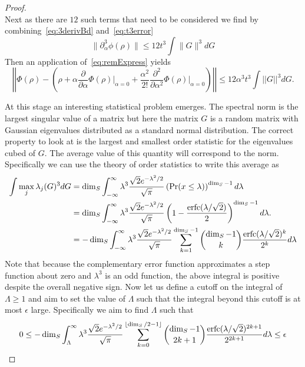\documentclass{article}
\newcommand{\norm}[1]{\left| \left| #1 \right| \right|}
\begin{document}
\begin{proof}
\begin{equation}
\end{equation}
Next as there are $12$ such terms that need to be considered we find by combining~\eqref{eq:3derivBd} and~\eqref{eq:t3error}
\begin{equation}
    \|\partial_\alpha^3 \phi(\rho) \| \le 12t^3\int \|G\|^3 dG
\end{equation}
Then an application of~\eqref{eq:remExpress} yields
\begin{equation}
    \norm{\Phi(\rho) - \left(\rho + {\alpha} \frac{\partial}{\partial \alpha} \Phi(\rho) \bigg|_{\alpha = 0} + \frac{\alpha^2}{2!} \frac{\partial^2}{\partial \alpha^2} \Phi(\rho) \bigg|_{\alpha = 0} \right)} \leq 12 \alpha^3 t^3 \int \norm{G}^3 dG.\label{eq:remTaylorBd}
\end{equation}

At this stage an interesting statistical problem emerges.  The spectral norm is the largest singular value of a matrix but here the matrix $G$ is a random matrix with Gaussian eigenvalues distributed as a standard normal distribution.  The correct property to look at is the largest and smallest order statistic for the eigenvalues cubed of $G$.  The average value of this quantity will correspond to the norm.  Specifically we can use the theory of order statistics to write this average as
\begin{align}
    \int \max_j \lambda_j(G)^3 dG &= \dim_S\int_{-\infty}^{\infty}  \lambda^3 \frac{\sqrt{2}e^{-\lambda^2/2}}{\sqrt{\pi}} \left({\rm Pr}(x\le \lambda)\right)^{\dim_S -1} d\lambda\\
    &= \dim_S\int_{-\infty}^{\infty}  \lambda^3 \frac{\sqrt{2}e^{-\lambda^2/2}}{\sqrt{\pi}} \left(1-\frac{{\rm erfc}(\lambda/\sqrt{2})}{2} \right)^{\dim_S-1} d\lambda.\\
    &=-\dim_S\int_{-\infty}^{\infty}  \lambda^3 \frac{\sqrt{2}e^{-\lambda^2/2}}{\sqrt{\pi}} \sum_{k=1}^{\dim_S-1} \binom{\dim_S-1}{k}\frac{{\rm erfc}(\lambda/\sqrt{2})^{k}}{2^{k}} d\lambda
\end{align}
Note that because the complementary error function approximates a step function about zero and $\lambda^3$ is an odd function, the above integral is positive despite the overall negative sign.
Now let us define a cutoff on the integral of $\Lambda\ge 1$ and aim to set the value of $\Lambda$ such that the integral beyond this cutoff is at most $\epsilon$ large.  Specifically we aim to find $\Lambda$ such that
\begin{equation}
    0\le -\dim_S\int_{\Lambda}^{\infty}  \lambda^3 \frac{\sqrt{2}e^{-\lambda^2/2}}{\sqrt{\pi}} \sum_{k=0}^{\lfloor \dim_S/2-1\rfloor} \binom{\dim_S-1}{2k+1}\frac{{\rm erfc}(\lambda/\sqrt{2})^{2k+1}}{2^{2k+1}} d\lambda \le \epsilon

\end{equation}
\end{proof}
\end{document}

